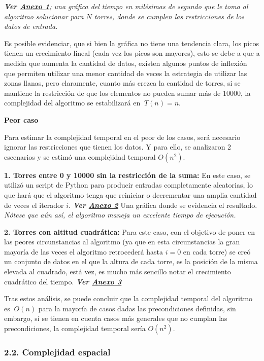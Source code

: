 \documentclass[
]{article}
\begin{document}
\emph{\textbf{Ver \protect\hyperlink{anexo-1}{Anexo 1}}; una gráfica del
tiempo en milésimas de segundo que le toma al algoritmo solucionar para
\(N\) torres, donde se cumplen las restricciones de los datos de
entrada.}

Es posible evidenciar, que si bien la gráfica no tiene una tendencia
clara, los picos tienen un crecimiento lineal (cada vez los picos son
mayores), esto se debe a que a medida que aumenta la cantidad de datos,
existen algunos puntos de inflexión que permiten utilizar una menor
cantidad de veces la estrategia de utilizar las zonas llanas, pero
claramente, cuanto más crezca la cantidad de torres, si se mantiene la
restricción de que los elementos no pueden sumar más de 10000, la
complejidad del algoritmo se estabilizará en \(\ T(n) = n\).

\textbf{Peor caso}

Para estimar la complejidad temporal en el peor de los casos, será
necesario ignorar las restricciones que tienen los datos. Y para ello,
se analizaron 2 escenarios y se estimó una complejidad temporal
\(O(n^2)\).

\textbf{1. Torres entre 0 y 10000 sin la restricción de la suma:} En
este caso, se utilizó un script de Python para producir entradas
completamente aleatorias, lo que hará que el algoritmo tenga que
reiniciar o decrementar una amplia cantidad de veces el iterador \(i\).
\textbf{\emph{Ver \protect\hyperlink{anexo-2}{Anexo 2}}} Una gráfica
donde se evidencia el resultado. \emph{Nótese que aún así, el algoritmo
maneja un excelente tiempo de ejecución.}

\textbf{2. Torres con altitud cuadrática:} Para este caso, con el
objetivo de poner en las peores circunstancias al algoritmo (ya que en
esta circunstancias la gran mayoría de las veces el algoritmo
retrocederá hasta \(i=0\) en cada torre) se creó un conjunto de datos en
el que la altura de cada torre, es la posición de la misma elevada al
cuadrado, está vez, es mucho más sencillo notar el crecimiento
cuadrático del tiempo. \textbf{\emph{Ver
\protect\hyperlink{anexo-3}{Anexo 3}}}

Tras estos análisis, se puede concluir que la complejidad temporal del
algoritmo es \(\ O(n)\) para la mayoría de casos dadas las
precondiciones definidas, sin embargo, sí se tienen en cuenta casos más
generales que no cumplan las precondiciones, la complejidad temporal
sería \(O(n^2)\).

\hypertarget{complejidad-espacial}{%
\subsubsection{2.2. Complejidad espacial}\label{complejidad-espacial}}
\end{document}
